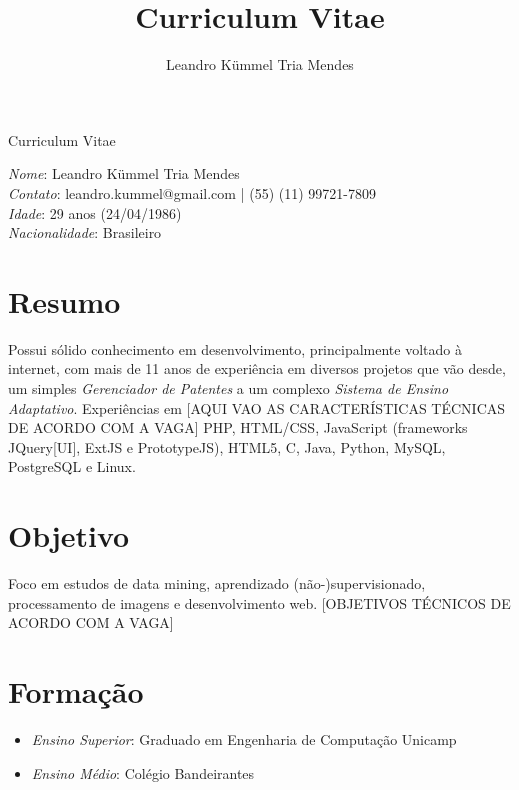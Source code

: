 \documentclass[a4paper,10pt]{article}
\title{Curriculum Vitae}
\author{Leandro Kümmel Tria Mendes}
\begin{document}
\begin{center} 
Curriculum Vitae
\end{center} 
\emph{Nome}: Leandro Kümmel Tria Mendes\\
\emph{Contato}: leandro.kummel@gmail.com | (55) (11) 99721-7809\\
\emph{Idade}: 29 anos (24/04/1986)\\
\emph{Nacionalidade}: Brasileiro\\
\section{Resumo}
Possui sólido conhecimento em desenvolvimento, principalmente voltado à internet, com mais de 11 anos de experiência em diversos projetos que vão desde, um simples \emph{Gerenciador de Patentes} a um complexo \emph{Sistema de Ensino Adaptativo}. Experiências em [AQUI VAO AS CARACTERÍSTICAS TÉCNICAS DE ACORDO COM A VAGA] PHP, HTML/CSS, JavaScript (frameworks JQuery[UI], ExtJS e PrototypeJS), HTML5, C, Java, Python, MySQL, PostgreSQL e Linux.
\section{Objetivo}
Foco em estudos de data mining, aprendizado (não-)supervisionado, processamento de imagens e desenvolvimento web. [OBJETIVOS TÉCNICOS DE ACORDO COM A VAGA]
\section{Formação}
\begin{itemize}
\item \emph{Ensino Superior}: Graduado em Engenharia de Computação Unicamp 
\item \emph{Ensino Médio}: Colégio Bandeirantes

\end{itemize}
\end{document}
